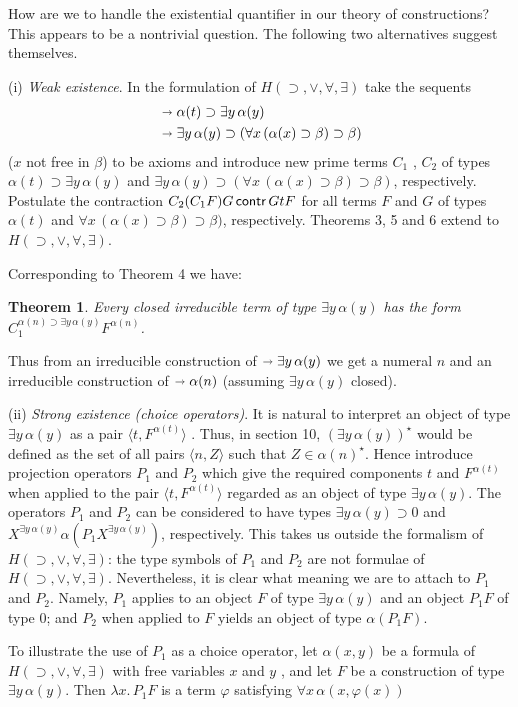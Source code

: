 \documentclass[12pt]{article}
\def\imp{\shortrightarrow}
\def\l{\lambda}
\def\limp{\supset}
\def\a{\alpha}
\def\b{\beta}
\def\ey{\exists y \, \a(y)}
\def\HIMPE{H(\limp, \lor, \forall, \exists)}
\newtheorem{theorem}{Theorem}
\begin{document}
How are we to handle the existential quantifier in our theory of constructions? This appears to be a nontrivial question. The following two alternatives suggest themselves.

\bigskip
\noindent
(i) {\it Weak existence}. In the formulation of $\HIMPE$ take the sequents
\begin{align*}
&\imp \a (t) \limp \exists y\, \a(y) \\
&\imp \exists y\, \a(y) \limp ( \forall x \, (\a(x) \limp \b) \limp \b)
\end{align*}
%
($x$ not free in $\b$) to be axioms and introduce new prime terms $C_1$ , $C_2$ of types $\a(t) \limp \exists y \, \a(y)$ and  $\exists y\, \a(y) \limp ( \forall x \, (\a(x) \limp \b) \limp \b)$, respectively. Postulate the contraction $C_2 ( C_1 F ) G \mathop{\sf contr} G t F$
for all terms $F$ and $G$ of types $\a( t )$ and $\forall x \, (\a(x) \limp \b) \limp \b)$, respectively. Theorems 3, 5 and 6 extend to $\HIMPE$.

Corresponding to Theorem 4 we have:

\begin{theorem}
Every closed irreducible term of type $\exists y \, \a(y)$ has the form $C_1^{ \a(n) \limp \exists y \, \a(y)} F ^{\a (n)}$.
\end{theorem}
%
Thus from an irreducible construction of $\imp  \exists y \, \a(y)$ we get a numeral $n$ and an irreducible construction of $\imp \a( n )$ (assuming $\exists y \, \a(y)$ closed).

\bigskip
\noindent
(ii) {\it Strong existence (choice operators)}. It is natural to interpret an object of type $\ey$ as a pair $\langle t, F^{\a(t)}\rangle$ . Thus, in section 10, $(\ey)^\star$ would be defined as the set of all pairs $\langle n, Z\rangle$ such that $Z \in \a(n)^\star$. Hence introduce projection operators $P_1$ and $P_2$ which give the required components $t$ and $F^{\a(t)}$ when applied to the pair $\langle t, F^{\a(t)}\rangle$ regarded as an object of type $\ey$. The operators $P_1$ and $P_2$ can be considered to have types $\ey \limp 0$ and $X^{\ey}\a(P_1 X^{\ey})$, respectively. This takes us outside the formalism of $\HIMPE$: the type symbols of $P_1$ and $P_2$ are not formulae of $\HIMPE$. Nevertheless, it is clear what meaning we are to attach to $P_1$ and $P_2$. Namely, $P_1$ applies to an object $F$ of type $\ey$ and an object $P_1 F$ of type $0$; and $P_2$ when applied to $F$ yields an object of type $\a ( P_1 F )$.

To illustrate the use of $P_1$ as a choice operator, let $\a(x,y)$ be a formula of $\HIMPE$ with free variables $x$ and $y$ , and let $F$
 be a construction of type $\ey$. Then $\l x . \, P_1 F$ is a term $\varphi$ satisfying $\forall x \, \a (x, \varphi(x))$
\end{document}
